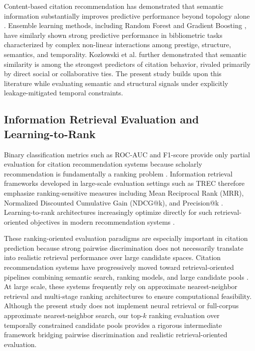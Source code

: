 \documentclass[11pt,a4paper]{article}
\begin{document}
Content-based citation recommendation has demonstrated that semantic information substantially improves predictive performance beyond topology alone \citep{bhagavatula2018content}. Ensemble learning methods, including Random Forest \citep{breiman2001random} and Gradient Boosting \citep{natekin2013gradient}, have similarly shown strong predictive performance in bibliometric tasks characterized by complex non-linear interactions among prestige, structure, semantics, and temporality. Kozlowski et al. \citep{kozlowski2025citation} further demonstrated that semantic similarity is among the strongest predictors of citation behavior, rivaled primarily by direct social or collaborative ties. The present study builds upon this literature while evaluating semantic and structural signals under explicitly leakage-mitigated temporal constraints.

\subsection{Information Retrieval Evaluation and Learning-to-Rank}

Binary classification metrics such as ROC-AUC and F1-score provide only partial evaluation for citation recommendation systems because scholarly recommendation is fundamentally a ranking problem \citep{manning2008introduction, powers2011evaluation}. Information retrieval frameworks developed in large-scale evaluation settings such as TREC \citep{voorhees2005trec} therefore emphasize ranking-sensitive measures including Mean Reciprocal Rank (MRR), Normalized Discounted Cumulative Gain (NDCG@k), and Precision@k \citep{jarvelin2002cumulated}. Learning-to-rank architectures increasingly optimize directly for such retrieval-oriented objectives in modern recommendation systems \citep{liu2009learning}.

These ranking-oriented evaluation paradigms are especially important in citation prediction because strong pairwise discrimination does not necessarily translate into realistic retrieval performance over large candidate spaces. Citation recommendation systems have progressively moved toward retrieval-oriented pipelines combining semantic search, ranking models, and large candidate pools \citep{bhagavatula2018content}. At large scale, these systems frequently rely on approximate nearest-neighbor retrieval and multi-stage ranking architectures to ensure computational feasibility. Although the present study does not implement neural retrieval or full-corpus approximate nearest-neighbor search, our top-\(k\) ranking evaluation over temporally constrained candidate pools provides a rigorous intermediate framework bridging pairwise discrimination and realistic retrieval-oriented evaluation.
\end{document}
